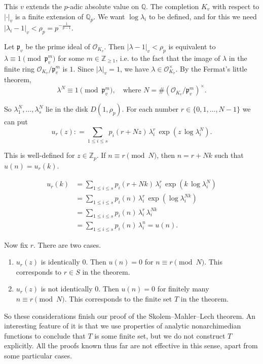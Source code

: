 \documentclass{article}
\newcommand{\dfn}{\mathrel{\mathop:}=}
\newcommand{\ZZ}{\mathbb{Z}}
\newcommand{\QQ}{\mathbb{Q}}
\theoremstyle{myplain}
\theoremstyle{mydefinition}
\begin{document}
This $v$ extends the $p$-adic absolute value on $\QQ$. The completion $K_v$ with
respect to $|\cdot|_v$ is a finite extension of $\QQ_p$. We want
$\log \lambda_i$ to be defined, and for this we need
$|\lambda_i - 1|_v < \rho_p = p^{-\frac{1}{p-1}}$.

Let $\mathfrak{p}_v$ be the prime ideal of $\mathcal{O}_{K_v}$. Then
$|\lambda - 1|_v < \rho_p$ is equivalent to
$\lambda \equiv 1 \pmod{\mathfrak{p}_v^m}$ for some $m \in \ZZ_{\ge 1}$, i.e. to
the fact that the image of $\lambda$ in the finite ring
$\mathcal{O}_{K_v} / \mathfrak{p}_v^m$ is $1$. Since $|\lambda|_v = 1$, we have
$\lambda \in \mathcal{O}_{K_v}^\times$. By the Fermat's little theorem,
\[ \lambda^N \equiv 1 \pmod{\mathfrak{p}_v^m}, \quad
  \text{where } N = \# (\mathcal{O}_{K_v} / \mathfrak{p}_v^m)^\times. \]

So $\lambda_1^N, \ldots, \lambda_s^N$ lie in the disk $D (1, \rho_p)$. For each
number $r \in \{ 0, 1, \ldots, N-1 \}$ we can put
\[ u_r (z) \dfn \sum_{1 \le i \le s} p_i (r + Nz) \, \lambda_i^r \, \exp (z \, \log \lambda_i^N). \]

This is well-defined for $z \in \ZZ_p$. If $n \equiv r \pmod{N}$, then
$n = r + N k$ such that $u (n) = u_r (k)$.

\begin{align*}
  u_r (k) & = \sum_{1 \le i \le s} p_i (r + Nk) \, \lambda_i^r \, \exp (k \, \log \lambda_i^N) \\
          & = \sum_{1 \le i \le s} p_i (n) \, \lambda_i^r \, \exp (\log \lambda_i^{Nk})\\
          & = \sum_{1 \le i \le s} p_i (n) \, \lambda_i^r \, \lambda_i^{N k}\\
          & = \sum_{1 \le i \le s} p_i (n) \, \lambda_i^n = u (n).
\end{align*}

Now fix $r$. There are two cases.

\begin{enumerate}
\item $u_r (z)$ is identically $0$. Then $u (n) = 0$ for $n \equiv r \pmod
  {N}$. This corresponds to $r \in S$ in the theorem.

\item $u_r (z)$ is not identically $0$. Then $u (n) = 0$ for finitely many
  $n \equiv r \pmod{N}$. This corresponds to the finite set $T$ in the theorem.
\end{enumerate}

So these considerations finish our proof of the Skolem--Mahler--Lech theorem. An
interesting feature of it is that we use properties of analytic nonarchimedian
functions to conclude that $T$ is some finite set, but we do not construct $T$
explicitly. All the proofs known thus far are not effective in this sense, apart
from some particular cases.
\end{document}
